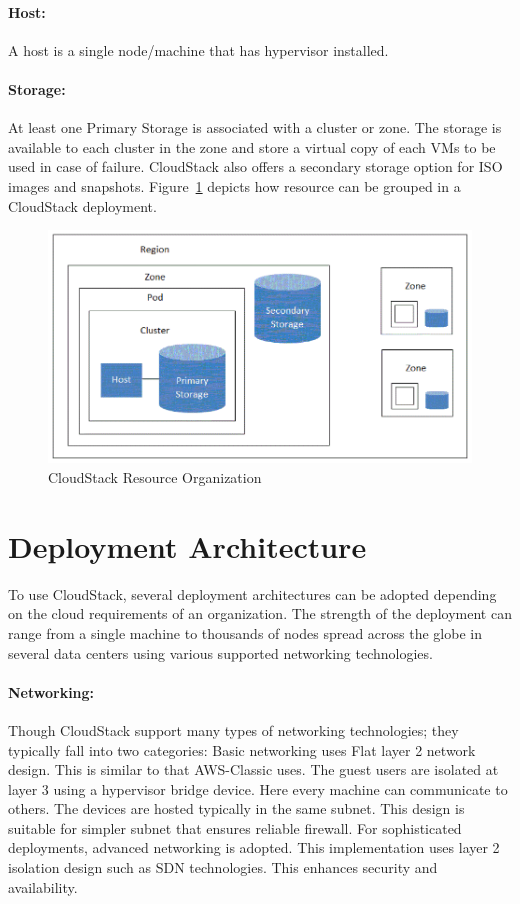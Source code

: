 \paragraph{Host:}	A host is a single node/machine that has hypervisor installed.
\paragraph{Storage:}	At least one Primary Storage is associated with a cluster or zone. The 
storage is available to each cluster in the zone and store a virtual copy of 
each VMs to be used in case of failure. CloudStack also offers a secondary storage
option for ISO images and snapshots.
Figure~\ref{F:cloudstack-resource-group} depicts how resource can 
be grouped in a CloudStack deployment.

\begin{figure}[htb]
\includegraphics[width=\columnwidth]{images/hid-sp18-417-cloudstack.png}
\caption{CloudStack Resource Organization~\cite{hid-sp18-417-cloudstack-resource-grouping}}
\label{F:cloudstack-resource-group}
\end{figure}

\section{Deployment Architecture}

To use CloudStack, several deployment architectures can be adopted
depending on the cloud requirements of an organization. The strength
of the deployment can range from a single machine to thousands of
nodes spread across the globe in several data centers using various supported
networking technologies.

\paragraph {Networking:} Though CloudStack support many types of networking 
technologies; they typically fall into two categories: Basic networking uses 
Flat layer 2 network design. This is similar to that AWS-Classic uses. The
guest users are isolated at layer 3 using a hypervisor bridge device. Here 
every machine can communicate to others. The devices are hosted typically in 
the same subnet.  This design is suitable for simpler subnet that ensures 
reliable firewall. For sophisticated deployments, advanced networking is 
adopted. This implementation uses layer 2 isolation design such as SDN technologies.
This enhances security and availability.~\cite{hid-sp18-417-www-cloudstack-networking} 

